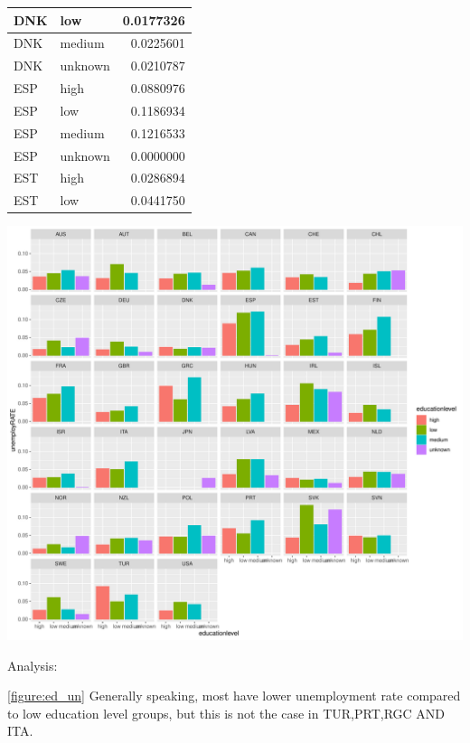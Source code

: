 \documentclass[11pt,a4paper,]{article}
\let\origfigure\figure
\let\endorigfigure\endfigure
\renewenvironment{figure}[1][2] {
    \expandafter\origfigure\expandafter[H]
} {
    \endorigfigure
}%
\begin{document}
\begin{table}
\begin{tabular}[t]{l|l|r}
DNK & low & 0.0177326\\
\hline
DNK & medium & 0.0225601\\
\hline
DNK & unknown & 0.0210787\\
\hline
ESP & high & 0.0880976\\
\hline
ESP & low & 0.1186934\\
\hline
ESP & medium & 0.1216533\\
\hline
ESP & unknown & 0.0000000\\
\hline
EST & high & 0.0286894\\
\hline
EST & low & 0.0441750\\
\hline
\end{tabular}
\end{table}

\pagebreak

\begin{figure}
\centering
\includegraphics{ETC5513assignment4_files/figure-latex/ed_un-1.pdf}
\caption{(\#fig:ed\_un)unemployment rate among different education level}
\end{figure}

Analysis:

\ref{figure:ed_un} Generally speaking, most have lower unemployment rate compared to low education level groups, but this is not the case in TUR,PRT,RGC AND ITA.
\end{document}
